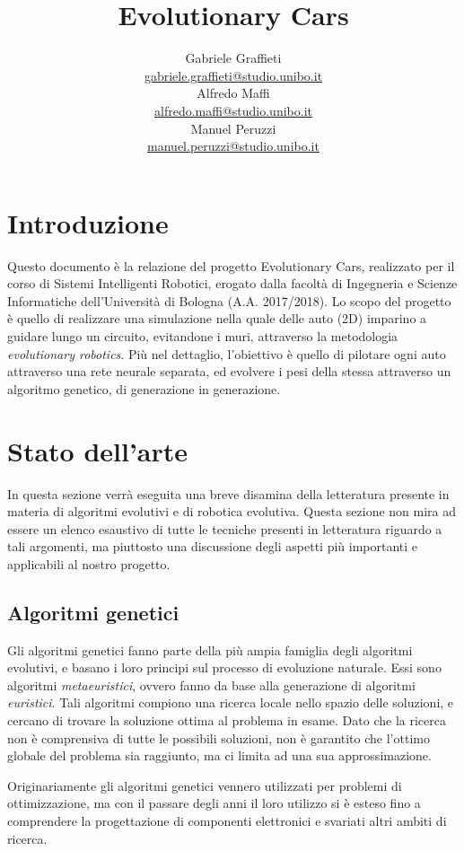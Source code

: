 \documentclass[a4paper,12pt]{article}
\title{\vspace{-5em}\Huge \textbf{Evolutionary Cars}
}
\author{
	Gabriele Graffieti \\ \small \url{gabriele.graffieti@studio.unibo.it}
	\vspace{15pt}
	\\
	Alfredo Maffi \\ \small \url{alfredo.maffi@studio.unibo.it}
	\vspace{15pt}
	\\
	Manuel Peruzzi \\ \small \url{manuel.peruzzi@studio.unibo.it}
}
\date{}
\begin{document}
\maketitle
{}
\tableofcontents
\newpage

\section{Introduzione}

Questo documento è la relazione del progetto Evolutionary Cars, realizzato per il corso di Sistemi Intelligenti Robotici, erogato dalla facoltà di Ingegneria e Scienze Informatiche dell'Università di Bologna (A.A. 2017/2018). Lo scopo del progetto è quello di realizzare una simulazione nella quale delle auto (2D) imparino a guidare lungo un circuito, evitandone i muri, attraverso la metodologia \emph{evolutionary robotics}. Più nel dettaglio, l'obiettivo è quello di pilotare ogni auto attraverso una rete neurale separata, ed evolvere i pesi della stessa attraverso un algoritmo genetico, di generazione in generazione.

\section{Stato dell'arte} \label{stato-dell-arte}
In questa sezione verrà eseguita una breve disamina della letteratura presente in materia di algoritmi evolutivi e di robotica evolutiva. Questa sezione non mira ad essere un elenco esaustivo di tutte le tecniche presenti in letteratura riguardo a tali argomenti, ma piuttosto una discussione degli aspetti più importanti e applicabili al nostro progetto. 
\subsection*{Algoritmi genetici}
Gli algoritmi genetici fanno parte della più ampia famiglia degli algoritmi evolutivi, e basano i loro principi sul processo di evoluzione naturale. Essi sono algoritmi \emph{metaeuristici}, ovvero fanno da base alla generazione di algoritmi \emph{euristici}. Tali algoritmi compiono una ricerca locale nello spazio delle soluzioni, e cercano di trovare la soluzione ottima al problema in esame. Dato che la ricerca non è comprensiva di tutte le possibili soluzioni, non è garantito che l'ottimo globale del problema sia raggiunto, ma ci limita ad una sua approssimazione. 

Originariamente gli algoritmi genetici vennero utilizzati per problemi di ottimizzazione, ma con il passare degli anni il loro utilizzo si è esteso fino a comprendere la progettazione di componenti elettronici \cite{antenna} e svariati altri ambiti di ricerca.
\end{document}
